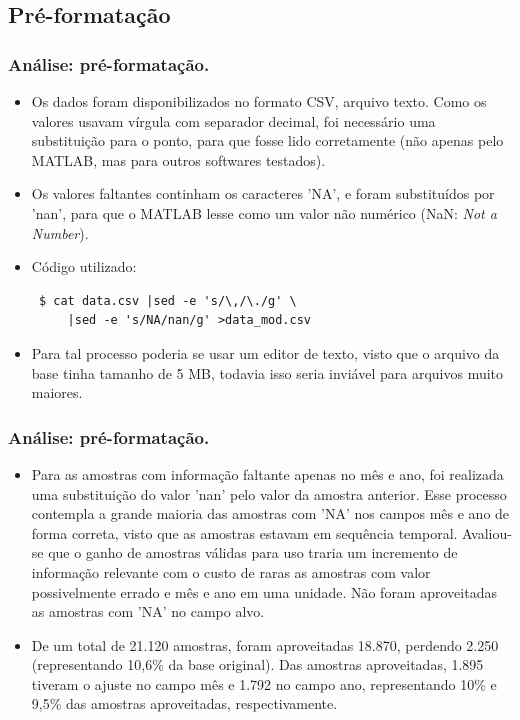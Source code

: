 \documentclass[xcolor=dvipsnames,xcolor=table]{beamer}
\begin{document}
\subsection{Pré-formatação}
\begin{frame}[fragile]\frametitle{Análise: pré-formatação.}

\begin{itemize}
\item Os dados foram disponibilizados no formato CSV, arquivo texto. Como os valores usavam vírgula com separador decimal, foi necessário uma substituição para o ponto, para que fosse lido corretamente (não apenas pelo MATLAB, mas para outros softwares testados).

\item Os valores faltantes continham os caracteres 'NA', e foram substituídos por 'nan', para que o MATLAB lesse como um valor não numérico (NaN: \emph{Not a Number}).

\item Código utilizado:

\lstset{numberstyle=\small, numbersep=4pt, frame = single, language=bash}
\begin{lstlisting}
 $ cat data.csv |sed -e 's/\,/\./g' \
     |sed -e 's/NA/nan/g' >data_mod.csv
\end{lstlisting}
\item Para tal processo poderia se usar um editor de texto, visto que o arquivo da base tinha tamanho de 5 MB, todavia isso seria inviável para arquivos muito maiores.

\end{itemize}
\end{frame}

\begin{frame}[fragile]\frametitle{Análise: pré-formatação.}

\begin{itemize}
\item Para as amostras com informação faltante apenas no mês e ano, foi realizada uma substituição do valor 'nan' pelo valor da amostra anterior. Esse processo contempla a grande maioria das amostras com 'NA' nos campos mês e ano de forma correta, visto que as amostras estavam em sequência temporal. Avaliou-se que o ganho de amostras válidas para uso traria um incremento de informação relevante com o custo de raras as amostras com valor possivelmente errado e mês e ano em uma unidade. Não foram aproveitadas as amostras com 'NA' no campo alvo.

\item De um total de 21.120 amostras, foram aproveitadas 18.870, perdendo 2.250 (representando 10,6\% da base original). Das amostras aproveitadas, 1.895 tiveram o ajuste no campo mês e 1.792 no campo ano, representando 10\% e 9,5\% das amostras aproveitadas, respectivamente.

\end{itemize}
\end{frame}
\end{document}
